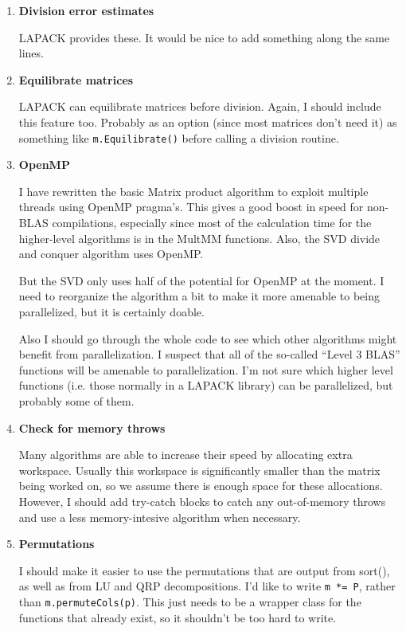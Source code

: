 \documentclass[twoside,letterpaper,11pt]{article}
\renewcommand{\tt}[1]{{\lstinline {#1}}}
\begin{document}
\begin{enumerate}
\item
\textbf{Division error estimates}

LAPACK provides these.  It would be nice to add something along the same lines.

\item
\textbf{Equilibrate matrices}

LAPACK can equilibrate matrices before division.  Again, I should include this
feature too.  Probably as an option (since most matrices don't need it)
as something like \tt{m.Equilibrate()} before calling a division routine.

\item
\textbf{OpenMP}

I have rewritten the basic Matrix product algorithm to exploit multiple threads using 
OpenMP pragma's.  This gives a good boost in speed for non-BLAS 
compilations, especially since most of the calculation time for the higher-level
algorithms is in the MultMM functions.  Also, the SVD divide and conquer
algorithm uses OpenMP.  

But the SVD only uses half of the potential for OpenMP at the moment.  I need
to reorganize the algorithm a bit to make it more amenable to being parallelized,
but it is certainly doable.

Also I should go through the whole code to
see which other algorithms might benefit from parallelization.  I suspect that all of
the so-called ``Level 3 BLAS'' functions will be amenable to parallelization.  I'm not sure
which higher level functions (i.e. those normally in a LAPACK library) can
be parallelized, but probably some of them.

\item
\textbf{Check for memory throws}

Many algorithms are able to increase their speed by allocating extra
workspace.  Usually this workspace is significantly smaller than the
matrix being worked on, so we assume there is enough space for 
these allocations.  However, I should add try-catch blocks to catch 
any out-of-memory throws and use a less memory-intesive algorithm
when necessary.

\item
\textbf{Permutations}

I should make it easier to use the permutations that are output from 
sort(), as well as from LU and QRP decompositions.   I'd like to write
\tt{m *= P}, rather than \tt{m.permuteCols(p)}.  This just needs to be a wrapper
class for the functions that already exist, so it shouldn't be too hard to write.

\end{enumerate}
\end{document}
